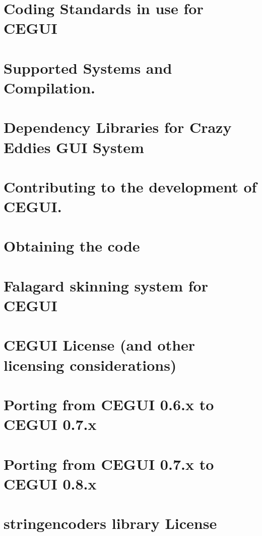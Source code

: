 \let\mypdfximage\pdfximage\def\pdfximage{\immediate\mypdfximage}\documentclass[twoside]{book}
\newcommand{\+}{\discretionary{\mbox{\scriptsize$\hookleftarrow$}}{}{}}
\begin{document}
\chapter{Coding Standards in use for C\+E\+G\+UI}
\label{code_standards}

\chapter{Supported Systems and Compilation.}
\label{compiling}

\chapter{Dependency Libraries for Crazy Eddie\textquotesingle{}s G\+UI System}
\label{dependencies}

\chapter{Contributing to the development of C\+E\+G\+UI.}
\label{devel}

\chapter{Obtaining the code}
\label{downloading}

\chapter{Falagard skinning system for C\+E\+G\+UI}
\label{fal_man}

\chapter{C\+E\+G\+UI License (and other licensing considerations)}
\label{licensing}

\chapter{Porting from C\+E\+G\+UI 0.6.x to C\+E\+G\+UI 0.7.x}
\label{porting6to7}

\chapter{Porting from C\+E\+G\+UI 0.7.x to C\+E\+G\+UI 0.8.x}
\label{porting7to8}

\chapter{stringencoders library License}
\label{stringencoders_lic}

\end{document}
